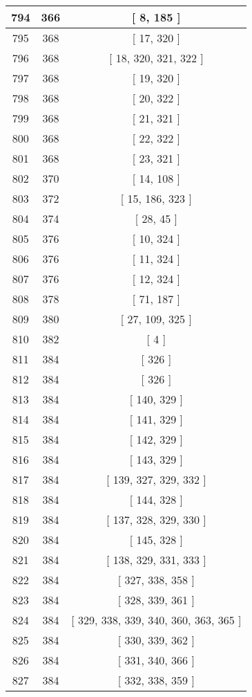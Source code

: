 \begin{center}
\begin{longtable}[H]{|| c c c ||}
\\\hline
794 & 366 & [ 8, 185 ]
\\\hline
795 & 368 & [ 17, 320 ]
\\\hline
796 & 368 & [ 18, 320, 321, 322 ]
\\\hline
797 & 368 & [ 19, 320 ]
\\\hline
798 & 368 & [ 20, 322 ]
\\\hline
799 & 368 & [ 21, 321 ]
\\\hline
800 & 368 & [ 22, 322 ]
\\\hline
801 & 368 & [ 23, 321 ]
\\\hline
802 & 370 & [ 14, 108 ]
\\\hline
803 & 372 & [ 15, 186, 323 ]
\\\hline
804 & 374 & [ 28, 45 ]
\\\hline
805 & 376 & [ 10, 324 ]
\\\hline
806 & 376 & [ 11, 324 ]
\\\hline
807 & 376 & [ 12, 324 ]
\\\hline
808 & 378 & [ 71, 187 ]
\\\hline
809 & 380 & [ 27, 109, 325 ]
\\\hline
810 & 382 & [ 4 ]
\\\hline
811 & 384 & [ 326 ]
\\\hline
812 & 384 & [ 326 ]
\\\hline
813 & 384 & [ 140, 329 ]
\\\hline
814 & 384 & [ 141, 329 ]
\\\hline
815 & 384 & [ 142, 329 ]
\\\hline
816 & 384 & [ 143, 329 ]
\\\hline
817 & 384 & [ 139, 327, 329, 332 ]
\\\hline
818 & 384 & [ 144, 328 ]
\\\hline
819 & 384 & [ 137, 328, 329, 330 ]
\\\hline
820 & 384 & [ 145, 328 ]
\\\hline
821 & 384 & [ 138, 329, 331, 333 ]
\\\hline
822 & 384 & [ 327, 338, 358 ]
\\\hline
823 & 384 & [ 328, 339, 361 ]
\\\hline
824 & 384 & [ 329, 338, 339, 340, 360, 363, 365 ]
\\\hline
825 & 384 & [ 330, 339, 362 ]
\\\hline
826 & 384 & [ 331, 340, 366 ]
\\\hline
827 & 384 & [ 332, 338, 359 ]
\\\hline

\end{longtable}
\end{center}
